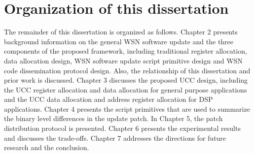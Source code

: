 \section{Organization of this dissertation}
The remainder of this dissertation is organized as follows. 
Chapter 2 presents background information on the general WSN software update and the three components of 
the proposed framework, including traditional register allocation,
data allocation design, WSN software update script primitive design and WSN code dissemination protocol design.
Also, the relationship of this dissertation and prior work is discussed. 
Chapter 3 discusses the proposed UCC design, including the UCC register allocation and data allocation for
general purpose applications and the UCC data allocation and address register allocation for DSP applications.
Chapter 4 presents the script primitives that are used to summarize the binary level differences
in the update patch.
In Chapter 5, the patch distribution protocol is presented. 
Chapter 6 presents the experimental results and discusses the trade-offs.
Chapter 7 addresses the directions for future
research and the conclusion.
